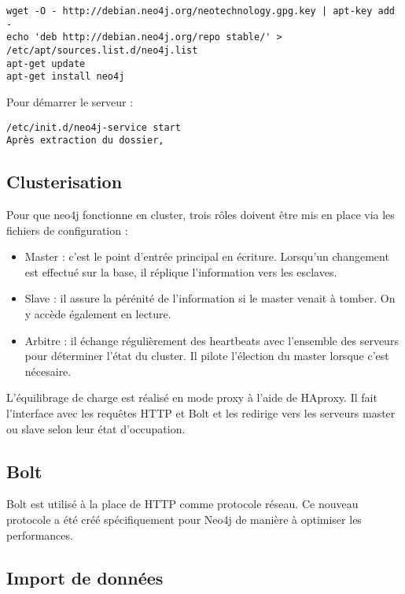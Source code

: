 \begin{lstlisting}
wget -O - http://debian.neo4j.org/neotechnology.gpg.key | apt-key add -
echo 'deb http://debian.neo4j.org/repo stable/' > /etc/apt/sources.list.d/neo4j.list
apt-get update
apt-get install neo4j
\end{lstlisting}

Pour démarrer le serveur :
\begin{lstlisting}
/etc/init.d/neo4j-service start
Après extraction du dossier, 
\end{lstlisting}

\subsection{Clusterisation}

Pour que neo4j fonctionne en cluster, trois rôles doivent être mis en place via les fichiers de configuration :

\begin{itemize}
      \item Master : c'est le point d'entrée principal en écriture. Lorsqu'un changement est effectué sur la base, il réplique l'information vers les esclaves.
      \item Slave : il assure la pérénité de l'information si le master venait à tomber. On y accède également en lecture.
      \item Arbitre : il échange régulièrement des heartbeats avec l'ensemble des serveurs pour déterminer l'état du cluster. Il pilote l'élection du master lorsque c'est nécesaire.
\end{itemize}

L'équilibrage de charge est réalisé en mode proxy à l'aide de HAproxy. Il fait l'interface avec les requêtes HTTP et Bolt et les redirige vers les serveurs master ou slave selon leur état d'occupation.

\subsection{Bolt}

Bolt est utilisé à la place de HTTP comme protocole réseau. Ce nouveau protocole a été créé spécifiquement pour Neo4j de manière à optimiser les performances.

\subsection{Import de données}


